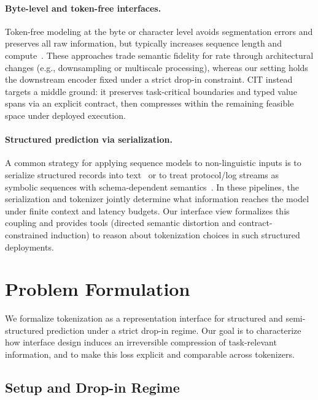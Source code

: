 \paragraph{Byte-level and token-free interfaces.}
Token-free modeling at the byte or character level avoids segmentation errors and preserves all raw information, but typically increases sequence length and compute~\cite{xue2022byt5,clark2022canine,yu2023megabyte}.
These approaches trade semantic fidelity for rate through architectural changes (e.g., downsampling or multiscale processing), whereas our setting holds the downstream encoder fixed under a strict drop-in constraint.
CIT instead targets a middle ground: it preserves task-critical boundaries and typed value spans via an explicit contract, then compresses within the remaining feasible space under deployed execution.

\paragraph{Structured prediction via serialization.}
A common strategy for applying sequence models to non-linguistic inputs is to serialize structured records into text~\cite{yin2020tabert,herzig2020tapas} or to treat protocol/log streams as symbolic sequences with schema-dependent semantics~\cite{he2017drain,du2017deeplog}.
In these pipelines, the serialization and tokenizer jointly determine what information reaches the model under finite context and latency budgets.
Our interface view formalizes this coupling and provides tools (directed semantic distortion and contract-constrained induction) to reason about tokenization choices in such structured deployments.


\section{Problem Formulation}
\label{sec:formulation}

We formalize tokenization as a representation interface for structured and semi-structured prediction under a strict drop-in regime.
Our goal is to characterize how interface design induces an irreversible compression of task-relevant information, and to make this loss explicit and comparable across tokenizers.

\subsection{Setup and Drop-in Regime}
\label{sec:setup}


